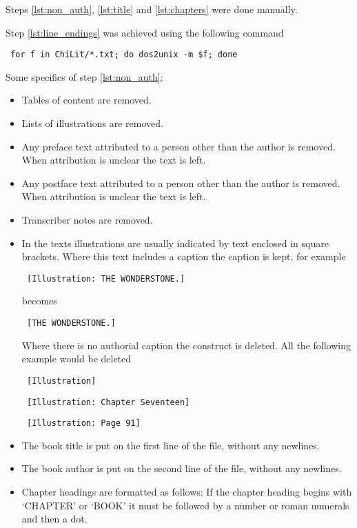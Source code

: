 \documentclass[a4paper,10pt]{paper}
\begin{document}
Steps \ref{lst:non_auth}, \ref{lst:title} and \ref{lst:chapters} were done manually.

Step \ref{lst:line_endings} was achieved using the following command
\begin{verbatim} for f in ChiLit/*.txt; do dos2unix -m $f; done \end{verbatim}

Some specifics of step \ref{lst:non_auth}:
\begin{itemize}
    \item Tables of content are removed.
    \item Lists of illustrations are removed.
    \item Any preface text attributed to a person other than the author is removed. When attribution is unclear the text is left.
    \item Any postface text attributed to a person other than the author is removed. When attribution is unclear the text is left.
    \item Transcriber notes are removed.
    \item In the texts illustrations are usually indicated by text enclosed in square brackets.
          Where this text includes a caption the caption is kept, for example
        \begin{verbatim} [Illustration: THE WONDERSTONE.] \end{verbatim}
          becomes
        \begin{verbatim} [THE WONDERSTONE.] \end{verbatim}
          Where there is no authorial caption the construct is deleted.
          All the following example would be deleted
        \begin{verbatim} [Illustration] \end{verbatim}
        \begin{verbatim} [Illustration: Chapter Seventeen] \end{verbatim}
        \begin{verbatim} [Illustration: Page 91] \end{verbatim}
    \item The book title is put on the first line of the file, without any newlines.
    \item The book author is put on the second line of the file, without any newlines.
    \item Chapter headings are formatted as follows:
        If the chapter heading begins with `CHAPTER' or `BOOK' it must be followed by a number or roman numerals and then a dot.

\end{itemize}
\end{document}
